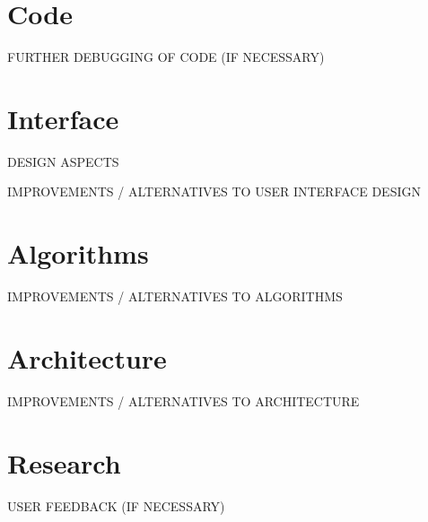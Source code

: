 \section{Code}

FURTHER DEBUGGING OF CODE (IF NECESSARY)

\section{Interface}

DESIGN ASPECTS

IMPROVEMENTS / ALTERNATIVES TO USER INTERFACE DESIGN

\section{Algorithms}

IMPROVEMENTS / ALTERNATIVES TO ALGORITHMS

\section{Architecture}

IMPROVEMENTS / ALTERNATIVES TO ARCHITECTURE

\section{Research}

USER FEEDBACK (IF NECESSARY)

\stopcontents[chapters]
